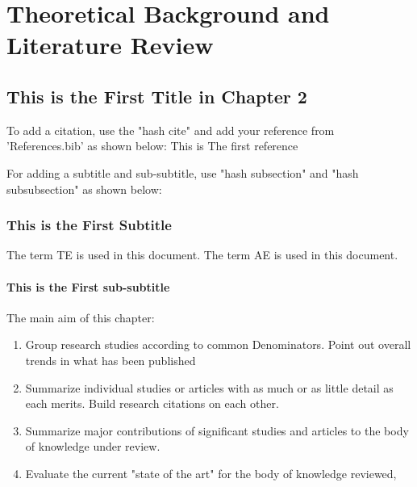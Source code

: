 \chapter{Theoretical Background and Literature Review}
\section{This is the First Title in Chapter 2}

To add a citation, use the "hash cite" and add your reference from 'References.bib' as shown below:
This is The first reference \cite{yao2024survey}

For adding a subtitle and sub-subtitle, use "hash subsection" and "hash subsubsection" as shown below: 

\subsection{This is the First Subtitle}

The term \ac{TE} is used in this document.
The term \ac{AE} is used in this document.

\subsubsection{This is the First sub-subtitle}

The  main aim of this chapter:
\begin{enumerate}
    \item Group research studies according to common Denominators. Point out overall trends in what has been published
    \item Summarize individual studies or articles with as much or as little detail as each merits. Build research citations on each other.
    \item  Summarize major contributions of significant studies and articles to the body of knowledge under review.
    \item Evaluate the current "state of the art" for the body of knowledge reviewed,
\end{enumerate}